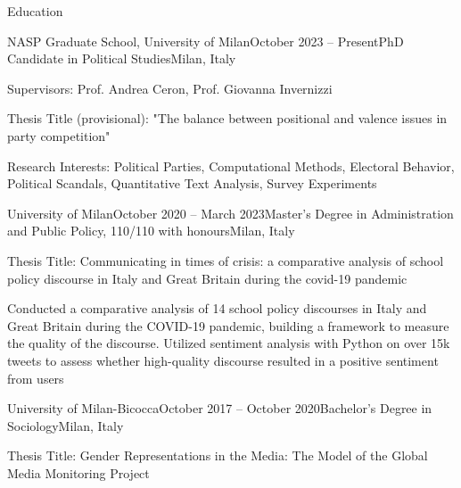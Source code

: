 \documentclass{cv} %
\begin{document}

\begin{rSection}{Education}

\begin{rSubsection}{NASP Graduate School, University of Milan}{October 2023 -- Present}{PhD Candidate in Political Studies}{Milan, Italy}
\item Supervisors: Prof. Andrea Ceron, Prof. Giovanna Invernizzi
\item Thesis Title (provisional): "The balance between positional and valence issues in party competition"
\item Research Interests: Political Parties, Computational Methods, Electoral Behavior, Political Scandals, Quantitative Text Analysis, Survey Experiments
\end{rSubsection}

\begin{rSubsection}{University of Milan}{October 2020 -- March 2023}{Master's Degree in Administration and Public Policy, 110/110 with honours}{Milan, Italy}
\item Thesis Title: Communicating in times of crisis: a comparative analysis of school policy discourse in Italy and Great Britain during the covid-19 pandemic
\item Conducted a comparative analysis of 14 school policy discourses in Italy and Great Britain during the COVID-19 pandemic, building a framework to measure the quality of the discourse. Utilized sentiment analysis with Python on over 15k tweets to assess whether high-quality discourse resulted in a positive sentiment from users
\end{rSubsection}

\begin{rSubsection}{University of Milan-Bicocca}{October 2017 -- October 2020}{Bachelor's Degree in Sociology}{Milan, Italy}
\item Thesis Title: Gender Representations in the Media: The Model of the Global Media Monitoring Project
\end{rSubsection}

\end{rSection}

\end{document}
